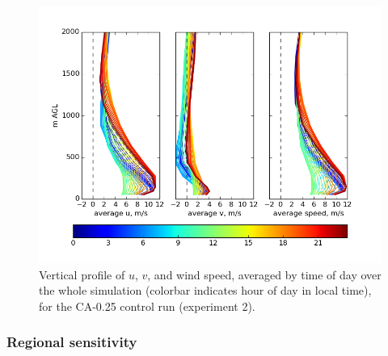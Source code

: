 \begin{figure}[here]
\includegraphics[width=\textwidth]{ch3-wind/img/windprof_hr_avg_CA0pt25.png}
\caption{Vertical profile of $u$, $v$, and wind speed, averaged by time of day over the whole simulation (colorbar indicates hour of day in local time), for the CA-0.25 control run (experiment 2).}
\label{fig:windSol_VertProfileDryRg}
\end{figure}

\subsubsection{Regional sensitivity}

